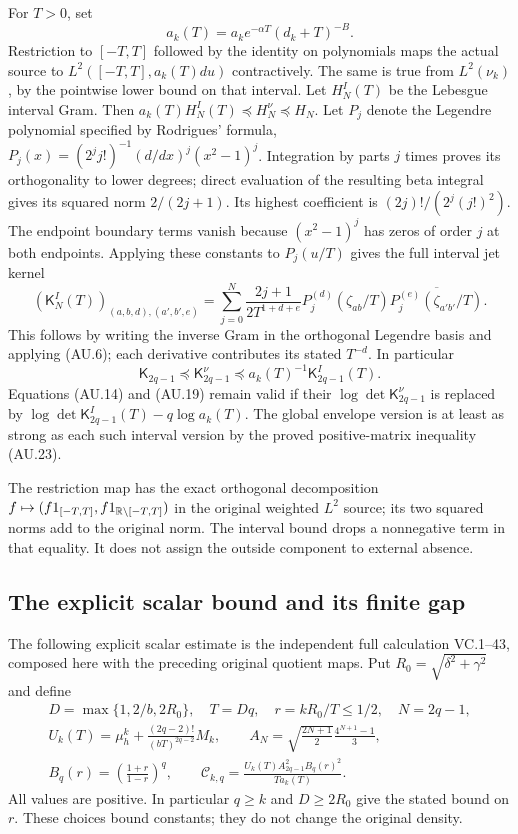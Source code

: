 For $T>0$, set
\[
 a_k(T)=a_ke^{-\alpha T}(d_k+T)^{-B}.
 \tag{AU.21}
\]
Restriction to $[-T,T]$ followed by the identity on polynomials maps
the actual source to $L^2([-T,T],a_k(T)du)$ contractively. The same
is true from $L^2(\nu_k)$, by the pointwise lower bound on that
interval. Let $H_N^I(T)$ be the Lebesgue interval Gram. Then
$a_k(T)H_N^I(T)\preceq H_N^\nu\preceq H_N$.
Let $P_j$ denote the Legendre polynomial specified by Rodrigues'
formula, $P_j(x)=(2^jj!)^{-1}(d/dx)^j(x^2-1)^j$.
Integration by parts $j$ times proves its orthogonality to lower
degrees; direct evaluation of the resulting beta integral gives its
squared norm $2/(2j+1)$. Its highest coefficient is
$(2j)!/(2^j(j!)^2)$. The endpoint boundary terms vanish because
$(x^2-1)^j$ has zeros of order $j$ at both endpoints.
Applying these constants to $P_j(u/T)$ gives the full interval jet
kernel
\[
 (\mathsf K_N^I(T))_{(a,b,d),(a',b',e)}
 =\sum_{j=0}^N\frac{2j+1}{2T^{1+d+e}}
 P_j^{(d)}(\zeta_{ab}/T)
 \overline{P_j^{(e)}(\zeta_{a'b'}/T)}.                    \tag{AU.22}
\]
This follows by writing the inverse Gram in the orthogonal Legendre
basis and applying (AU.6); each derivative contributes its stated
$T^{-d}$. In particular
\[
 \mathsf K_{2q-1}\preceq\mathsf K_{2q-1}^\nu
          \preceq a_k(T)^{-1}\mathsf K_{2q-1}^I(T).       \tag{AU.23}
\]
Equations (AU.14) and (AU.19) remain valid if their
$\log\det\mathsf K_{2q-1}^\nu$ is replaced by
$\log\det\mathsf K_{2q-1}^I(T)-q\log a_k(T)$.
The global envelope version is at least as strong as each such interval
version by the proved positive-matrix inequality (AU.23).

The restriction map has the exact orthogonal decomposition
$f\mapsto(f1_{[-T,T]},f1_{\mathbb{R}\setminus[-T,T]})$ in the original
weighted $L^2$ source; its two squared norms add to the original norm.
The interval bound drops a nonnegative term in that equality. It does
not assign the outside component to external absence.

\subsection{The explicit scalar bound and its finite gap}

The following explicit scalar estimate is the independent full calculation
VC.1--43, composed here with the preceding original quotient maps.
Put $R_0=\sqrt{\delta^2+\gamma^2}$ and define
\[
 \begin{gathered}
 D=\max\{1,2/b,2R_0\},\quad T=Dq,\quad r=kR_0/T\le1/2,\quad N=2q-1,\\
 U_k(T)=\mu_h^k+\frac{(2q-2)!}{(bT)^{2q-2}}M_k,\qquad
 A_N=\sqrt{\frac{2N+1}{2}}\frac{4^{N+1}-1}{3},\\
 B_q(r)=\left(\frac{1+r}{1-r}\right)^q,\qquad
 \mathcal C_{k,q}=
       \frac{U_k(T)A_{2q-1}^2B_q(r)^2}{T a_k(T)}.
 \end{gathered}                                             \tag{AU.24}
\]
All values are positive. In particular $q\ge k$ and $D\ge2R_0$
give the stated bound on $r$. These choices bound constants; they do
not change the original density.

